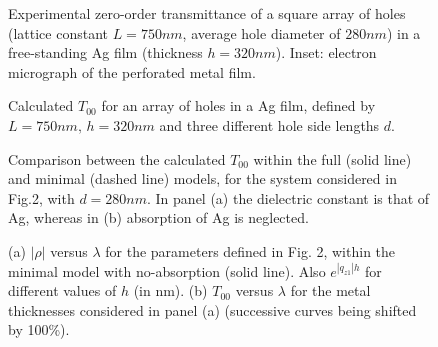 \begin{figure}[h]
\caption{Experimental zero-order transmittance of a square array of holes
(lattice constant $L = 750 nm$, average hole diameter of $280 nm$) 
in a free-standing
Ag film (thickness $h = 320 nm$). Inset: electron micrograph of
the perforated metal film.}
\end{figure}

\begin{figure}[h]
\caption{Calculated $T_{00}$ for 
an array of holes in
a Ag film, defined by $L = 750 nm,\, h = 320 nm$ and
three different hole side lengths $d$.} 
\end{figure}


\begin{figure}[h]
\caption{Comparison between the calculated $T_{00}$ within the full
(solid line) and minimal (dashed line) models, 
for the system considered in Fig.2,
with $d = 280 nm$. 
In panel (a) the dielectric constant is that of Ag, whereas in (b)
absorption of Ag is neglected.}
\end{figure}



\begin{figure}[h]
\caption{(a) $|\rho|$ versus $\lambda$ for the parameters 
defined in Fig. 2, within the minimal model with no-absorption 
(solid line). Also $e^{|q_{z1}| h}$ for different values of $h$ (in nm). 
(b) $T_{00}$ versus $\lambda$ for the  
metal thicknesses considered in panel (a) (successive curves being 
shifted by 100\%). 
}
\end{figure}



